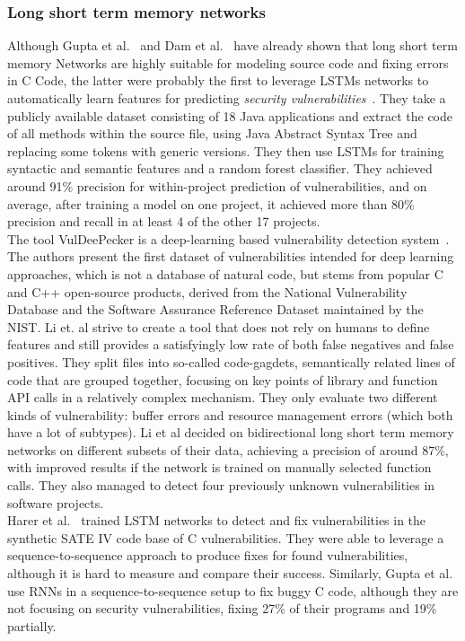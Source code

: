 \documentclass[
a4paper,
pagesize,
pdftex,
12pt,
twoside, %
BCOR=5mm, %
ngerman,
fleqn,
final,
]{scrartcl}
\begin{document}
	\subsubsection{Long short term memory networks}
	Although Gupta et al.~\cite{Gupta.2017b} and Dam et al.~\cite{Dam.2016b} have already shown that long short term memory Networks are highly suitable for modeling source code and fixing errors in C Code, the latter were probably the first to leverage LSTMs networks to automatically learn features for predicting \textit{security vulnerabilities}~\cite{Dam.2017}. They take a publicly available dataset consisting of 18 Java applications and extract the code of all methods within the source file, using Java Abstract Syntax Tree and replacing some tokens with generic versions. They then use LSTMs for training syntactic and semantic features and a random forest classifier. They achieved around 91\% precision for within-project prediction of vulnerabilities, and on average, after training a model on one project, it achieved more than 80\% precision and recall in at least 4 of the other 17 projects.\\
	The tool VulDeePecker is a deep-learning based vulnerability detection system~\cite{Li.2018}. The authors present the first dataset of vulnerabilities intended for deep learning approaches, which is not a database of natural code, but stems from popular C and C++ open-source products, derived from the National Vulnerability Database and the Software Assurance Reference Dataset maintained by the NIST. Li et. al strive to create a tool that does not rely on humans to define features and still provides a satisfyingly low rate of both false negatives and false positives. They split files into so-called code-gagdets, semantically related lines of code that are grouped together, focusing on key points of library and function API calls in a relatively complex mechanism. They only evaluate two different kinds of vulnerability: buffer errors and resource management errors (which both have a lot of subtypes). Li et al decided on bidirectional long short term memory networks on different subsets of their data, achieving a precision of around 87\%, with improved results if the network is trained on manually selected function calls. They also managed to detect four previously unknown vulnerabilities in software projects. \\
	Harer et al.~\cite{Harer.2018} trained LSTM networks to detect and fix vulnerabilities in the synthetic SATE IV code base of C vulnerabilities. They were able to leverage a sequence-to-sequence approach to produce fixes for found vulnerabilities, although it is hard to measure and compare their success. Similarly, Gupta et al.~\cite{Gupta.2017} use RNNs in a sequence-to-sequence setup to fix buggy C code, although they are not focusing on security vulnerabilities, fixing 27\% of their programs and 19\% partially.
	
\end{document}
